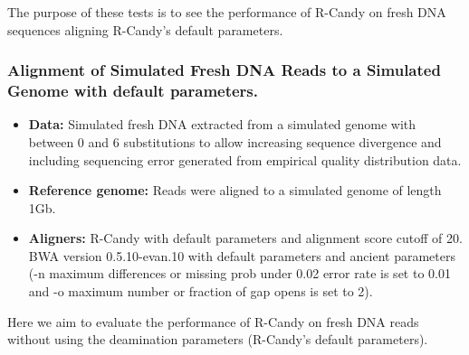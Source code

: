 \documentclass[11pt,a4paper]{report}
\begin{document}
The purpose of these tests is to see the performance of R-Candy on fresh DNA 
sequences aligning R-Candy's default parameters. 





\subsubsection {Alignment of Simulated Fresh DNA Reads to a Simulated Genome 
with default parameters.}

\label {Alignment of Simulated Fresh DNA Reads to a Simulated Genome with 
default parameters.}
 
 
 \begin{itemize}

   \item \textbf{Data:} Simulated fresh DNA extracted from a simulated genome 
   with between 0 and 6 substitutions to allow increasing sequence divergence
   and including sequencing error generated from empirical quality distribution 
   data.
 
   
   \item \textbf{Reference genome:} Reads were aligned to a simulated genome of 
   length 1Gb.

    \item \textbf{Aligners:} 
     R-Candy with default parameters and alignment score cutoff of 20. \\
     BWA version 0.5.10-evan.10 with default parameters and ancient parameters 
     (-n maximum differences or missing prob under 0.02 error rate is set to 0.01 
     and -o maximum number or fraction of gap opens is set to 2)\cite{green2010draft}.

  \end{itemize}
 
Here we aim to evaluate the performance of R-Candy on fresh DNA reads 
without using the deamination parameters (R-Candy's default parameters).
\end{document}
